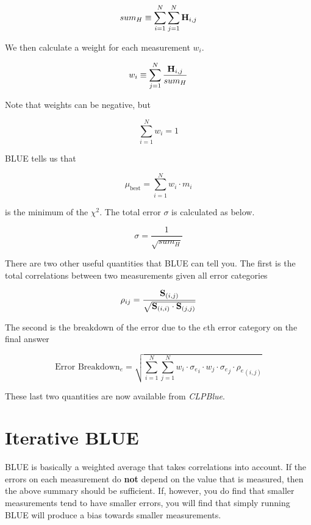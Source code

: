 \documentclass[12pt,twoside,letterpaper]{article}
\begin{document}
\begin{equation}
sum_H \equiv \sum_{i=1}^N \sum_{j=1}^N {\bf H}_{i,j}
\end{equation}

We then calculate a weight for each measurement $w_i$.

\begin{equation}
w_i \equiv \sum_{j=1}^N \frac {{\bf H}_{i,j}}{sum_H}\\
\end{equation}

Note that weights can be negative, but

\begin{equation}
\sum_{i=1}^N w_i = 1
\end{equation}

BLUE tells us that 

\begin{equation}
\mu_\textrm{best} = \sum_{i=1}^N w_i \cdot m_i
\end{equation}

is the minimum of the $\chi^2$.  The total error $\sigma$ is
calculated as below.

\begin{equation}
\sigma = \frac{1}{\sqrt{sum_H}}
\end{equation}

There are two other useful quantities that BLUE can tell you.  The
first is the total correlations between two measurements given all
error categories

\begin{equation}
\rho_{ij} = \frac {{\bf S}_{(i,j)}} 
    { \sqrt {{\bf S}_{(i,i)} \cdot {\bf S}_{(j,j)}} }
\end{equation}

The second is the breakdown of the error due to the $e$th error
category on the final answer

\begin{equation}
\textrm{Error Breakdown}_e = 
\sqrt{
\sum_{i=1}^N \sum_{j=1}^N w_i \cdot {\sigma_e}_i
\cdot w_j \cdot {\sigma_e}_j \cdot {\rho_e}_{(i,j)}
}
\end{equation}

These last two quantities are now available from {\em CLPBlue}.

\section {Iterative BLUE}

\hspace*{12pt} BLUE is basically a weighted average that takes
correlations into account.  If the errors on each measurement do {\bf
  not} depend on the value that is measured, then the above summary
should be sufficient.  If, however, you do find that smaller
measurements tend to have smaller errors, you will find that simply
running BLUE will produce a bias towards smaller measurements.
\end{document}
